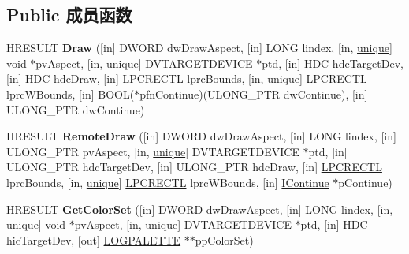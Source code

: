 \subsection*{Public 成员函数}
\begin{DoxyCompactItemize}
\item 
\mbox{\label{interface_i_view_object_a553add5413100ac5131ef6396224de55}} 
H\+R\+E\+S\+U\+LT {\bfseries Draw} (\mbox{[}in\mbox{]} D\+W\+O\+RD dw\+Draw\+Aspect, \mbox{[}in\mbox{]} L\+O\+NG lindex, \mbox{[}in, \hyperlink{interfaceunique}{unique}\mbox{]} \hyperlink{interfacevoid}{void} $\ast$pv\+Aspect, \mbox{[}in, \hyperlink{interfaceunique}{unique}\mbox{]} D\+V\+T\+A\+R\+G\+E\+T\+D\+E\+V\+I\+CE $\ast$ptd, \mbox{[}in\mbox{]} H\+DC hdc\+Target\+Dev, \mbox{[}in\mbox{]} H\+DC hdc\+Draw, \mbox{[}in\mbox{]} \hyperlink{struct___r_e_c_t_l}{L\+P\+C\+R\+E\+C\+TL} lprc\+Bounds, \mbox{[}in, \hyperlink{interfaceunique}{unique}\mbox{]} \hyperlink{struct___r_e_c_t_l}{L\+P\+C\+R\+E\+C\+TL} lprc\+W\+Bounds, \mbox{[}in\mbox{]} B\+O\+OL($\ast$pfn\+Continue)(U\+L\+O\+N\+G\+\_\+\+P\+TR dw\+Continue), \mbox{[}in\mbox{]} U\+L\+O\+N\+G\+\_\+\+P\+TR dw\+Continue)
\item 
\mbox{\label{interface_i_view_object_afc8bc5cc444f2a7be31f510fd7b32c02}} 
H\+R\+E\+S\+U\+LT {\bfseries Remote\+Draw} (\mbox{[}in\mbox{]} D\+W\+O\+RD dw\+Draw\+Aspect, \mbox{[}in\mbox{]} L\+O\+NG lindex, \mbox{[}in\mbox{]} U\+L\+O\+N\+G\+\_\+\+P\+TR pv\+Aspect, \mbox{[}in, \hyperlink{interfaceunique}{unique}\mbox{]} D\+V\+T\+A\+R\+G\+E\+T\+D\+E\+V\+I\+CE $\ast$ptd, \mbox{[}in\mbox{]} U\+L\+O\+N\+G\+\_\+\+P\+TR hdc\+Target\+Dev, \mbox{[}in\mbox{]} U\+L\+O\+N\+G\+\_\+\+P\+TR hdc\+Draw, \mbox{[}in\mbox{]} \hyperlink{struct___r_e_c_t_l}{L\+P\+C\+R\+E\+C\+TL} lprc\+Bounds, \mbox{[}in, \hyperlink{interfaceunique}{unique}\mbox{]} \hyperlink{struct___r_e_c_t_l}{L\+P\+C\+R\+E\+C\+TL} lprc\+W\+Bounds, \mbox{[}in\mbox{]} \hyperlink{interface_i_continue}{I\+Continue} $\ast$p\+Continue)
\item 
\mbox{\label{interface_i_view_object_a0745a6e7e1137d29502cff571082856e}} 
H\+R\+E\+S\+U\+LT {\bfseries Get\+Color\+Set} (\mbox{[}in\mbox{]} D\+W\+O\+RD dw\+Draw\+Aspect, \mbox{[}in\mbox{]} L\+O\+NG lindex, \mbox{[}in, \hyperlink{interfaceunique}{unique}\mbox{]} \hyperlink{interfacevoid}{void} $\ast$pv\+Aspect, \mbox{[}in, \hyperlink{interfaceunique}{unique}\mbox{]} D\+V\+T\+A\+R\+G\+E\+T\+D\+E\+V\+I\+CE $\ast$ptd, \mbox{[}in\mbox{]} H\+DC hic\+Target\+Dev, \mbox{[}out\mbox{]} \hyperlink{structtag_l_o_g_p_a_l_e_t_t_e}{L\+O\+G\+P\+A\+L\+E\+T\+TE} $\ast$$\ast$pp\+Color\+Set)
$$
\end{DoxyCompactItemize}
